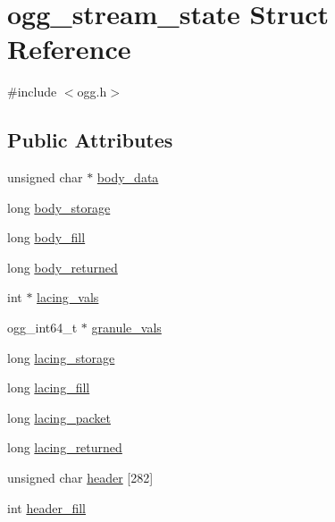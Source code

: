\hypertarget{structogg__stream__state}{}\section{ogg\+\_\+stream\+\_\+state Struct Reference}
\label{structogg__stream__state}


{\ttfamily \#include $<$ogg.\+h$>$}

\subsection*{Public Attributes}
\begin{DoxyCompactItemize}
\item 
unsigned char $\ast$ \mbox{\hyperlink{structogg__stream__state_a70d03b6f99c1d1e57f55e800b087dae8}{body\+\_\+data}}
\item 
long \mbox{\hyperlink{structogg__stream__state_acc4cf19d7e31e1a6daab8f76fdb0afd6}{body\+\_\+storage}}
\item 
long \mbox{\hyperlink{structogg__stream__state_a19d45a7b5004f13ae02b5a9502354b93}{body\+\_\+fill}}
\item 
long \mbox{\hyperlink{structogg__stream__state_a602e02c9b0d5653eea5bd4f97bade116}{body\+\_\+returned}}
\item 
int $\ast$ \mbox{\hyperlink{structogg__stream__state_a55f3febfdfa9600b66fa2a990297813e}{lacing\+\_\+vals}}
\item 
ogg\+\_\+int64\+\_\+t $\ast$ \mbox{\hyperlink{structogg__stream__state_a5ddadad0bd4d5c5381b21da6f11a7d0c}{granule\+\_\+vals}}
\item 
long \mbox{\hyperlink{structogg__stream__state_a23844488216514760bc66b38dfd6d4ae}{lacing\+\_\+storage}}
\item 
long \mbox{\hyperlink{structogg__stream__state_a6090ad58db768aa90218b0bc421d6f0e}{lacing\+\_\+fill}}
\item 
long \mbox{\hyperlink{structogg__stream__state_add3aba822d7f0e2e23c1927a20aaa683}{lacing\+\_\+packet}}
\item 
long \mbox{\hyperlink{structogg__stream__state_a541d66311781b45cf37d87107d515602}{lacing\+\_\+returned}}
\item 
unsigned char \mbox{\hyperlink{structogg__stream__state_aeb8496ef8051c2760c5d57424f30171a}{header}} \mbox{[}282\mbox{]}
\item 
int \mbox{\hyperlink{structogg__stream__state_af37e7ffba5e7197c8bfabee7a1a6b641}{header\+\_\+fill}}
\item 

\end{DoxyCompactItemize}
